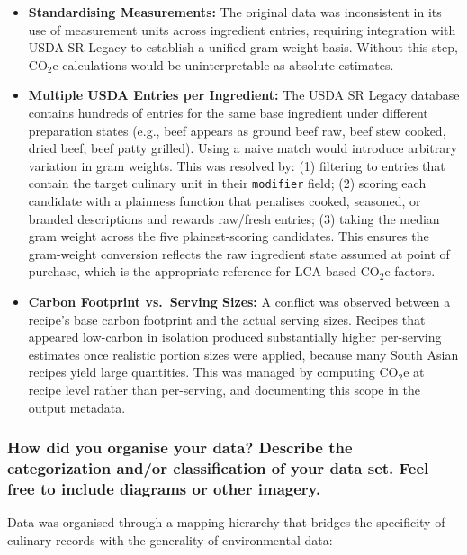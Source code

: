 \documentclass{article}
\newcommand{\question}[1]{#1}
\begin{document}
\begin{itemize}
    \item \textbf{Standardising Measurements:} The original data was inconsistent in its use of measurement units across ingredient entries, requiring integration with USDA SR Legacy to establish a unified gram-weight basis. Without this step, CO$_2$e calculations would be uninterpretable as absolute estimates.
    \item \textbf{Multiple USDA Entries per Ingredient:} The USDA SR Legacy database contains hundreds of entries for the same base ingredient under different preparation states (e.g., beef appears as ground beef raw, beef stew cooked, dried beef, beef patty grilled). Using a naive match would introduce arbitrary variation in gram weights. This was resolved by: (1) filtering to entries that contain the target culinary unit in their \texttt{modifier} field; (2) scoring each candidate with a plainness function that penalises cooked, seasoned, or branded descriptions and rewards raw/fresh entries; (3) taking the median gram weight across the five plainest-scoring candidates. This ensures the gram-weight conversion reflects the raw ingredient state assumed at point of purchase, which is the appropriate reference for LCA-based CO$_2$e factors.
    \item \textbf{Carbon Footprint vs.\ Serving Sizes:} A conflict was observed between a recipe's base carbon footprint and the actual serving sizes. Recipes that appeared low-carbon in isolation produced substantially higher per-serving estimates once realistic portion sizes were applied, because many South Asian recipes yield large quantities. This was managed by computing CO$_2$e at recipe level rather than per-serving, and documenting this scope in the output metadata.
\end{itemize}

\question{\subsubsection*{How did you organise your data? Describe the categorization and/or classification of your data set. Feel free to include diagrams or other imagery.}}

Data was organised through a mapping hierarchy that bridges the specificity of culinary records with the generality of environmental data:
\end{document}
